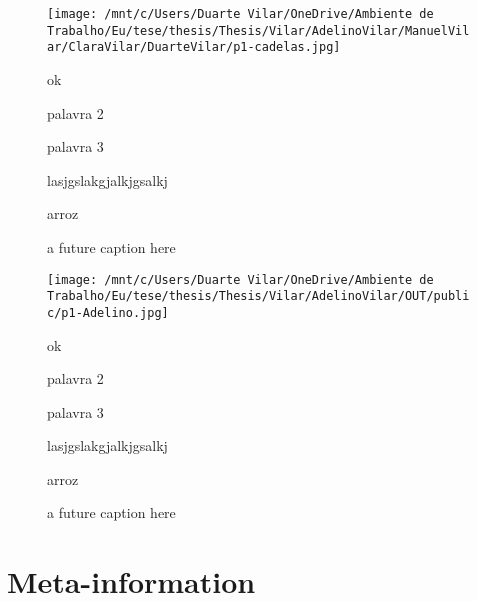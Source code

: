 \documentclass{article}
\begin{document}
    \begin{figure}[ht!]
        \begin{minipage}{0.35\textwidth}
            \centering
            \texttt{[image: /mnt/c/Users/Duarte Vilar/OneDrive/Ambiente de Trabalho/Eu/tese/thesis/Thesis/Vilar/AdelinoVilar/ManuelVilar/ClaraVilar/DuarteVilar/p1-cadelas.jpg]}
            \caption{a future caption here}
        \end{minipage}
        \hspace{1cm} %
        \begin{minipage}{0.3\textwidth}
            ok

            palavra 2

            palavra 3

            lasjgslakgjalkjgsalkj

            arroz
            
        \end{minipage}
    \end{figure}



    \begin{figure}[ht!]
        \begin{minipage}{0.35\textwidth}
            \centering
            \texttt{[image: /mnt/c/Users/Duarte Vilar/OneDrive/Ambiente de Trabalho/Eu/tese/thesis/Thesis/Vilar/AdelinoVilar/OUT/public/p1-Adelino.jpg]}
            \caption{a future caption here}
        \end{minipage}
        \hspace{1cm} %
        \begin{minipage}{0.3\textwidth}
            ok

            palavra 2

            palavra 3

            lasjgslakgjalkjgsalkj

            arroz
            
        \end{minipage}
    \end{figure}



\newpage
\section{Meta-information}
\end{document}
